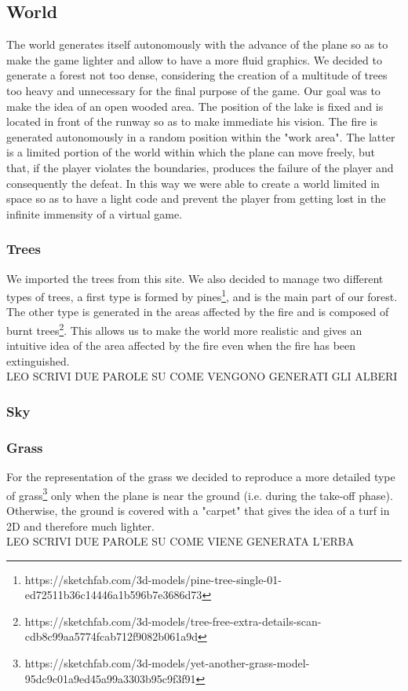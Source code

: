 \documentclass{article}
\begin{document}
\subsection*{World}
The world generates itself autonomously with the advance of the plane so as to make the game lighter and allow to have a more fluid graphics. We decided to generate a forest not too dense, considering the creation of a multitude of trees too heavy and unnecessary for the final purpose of the game. Our goal was to make the idea of an open wooded area. The position of the lake is fixed and is located in front of the runway so as to make immediate his vision. The fire is generated autonomously in a random position within the "work area". The latter is a limited portion of the world within which the plane can move freely, but that, if the player violates the boundaries, produces the failure of the player and consequently the defeat. In this way we were able to create a world limited in space so as to have a light code and prevent the player from getting lost in the infinite immensity of a virtual game.

\subsubsection*{Trees}
We imported the trees from this site. We also decided to manage two different types of trees, a first type is formed by pines\footnote{https://sketchfab.com/3d-models/pine-tree-single-01-ed72511b36c14446a1b596b7e3686d73}, and is the main part of our forest. The other type is generated in the areas affected by the fire and is composed of burnt trees\footnote{https://sketchfab.com/3d-models/tree-free-extra-details-scan-cdb8c99aa5774fcab712f9082b061a9d}. This allows us to make the world more realistic and gives an intuitive idea of the area affected by the fire even when the fire has been extinguished. \\
LEO SCRIVI DUE PAROLE SU COME VENGONO GENERATI GLI ALBERI

\subsubsection*{Sky}

\subsubsection*{Grass}
For the representation of the grass we decided to reproduce a more detailed type of grass\footnote{https://sketchfab.com/3d-models/yet-another-grass-model-95dc9c01a9ed45a99a3303b95c9f3f91} only when the plane is near the ground (i.e. during the take-off phase). Otherwise, the ground is covered with a "carpet" that gives the idea of a turf in 2D and therefore much lighter. \\
LEO SCRIVI DUE PAROLE SU COME VIENE GENERATA L'ERBA
\end{document}
